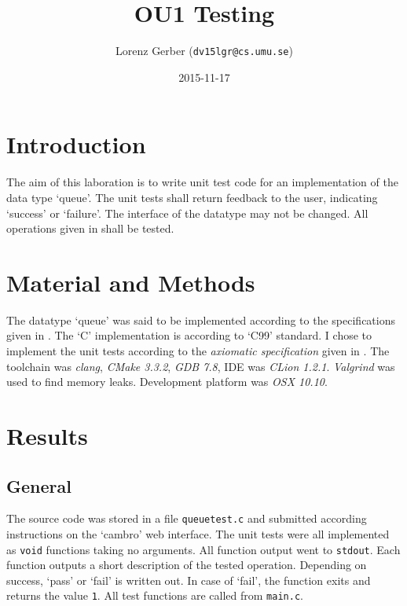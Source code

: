 \documentclass[a4paper,11pt,twoside]{article}
\title{OU1 Testing}
\author{Lorenz Gerber  ({\tt{dv15lgr@cs.umu.se}})}
\date{2015-11-17}
\begin{document}
\maketitle

\tableofcontents
\newpage

\section{Introduction} 
The aim of this laboration is to write unit test code for an
implementation of the data type `queue'. The unit tests shall 
return feedback to the user, indicating `success' or `failure'. The
interface of the datatype may not be changed. All operations given in
\cite[p. 155]{janlert2000} shall be tested.

\section{Material and Methods} 
The datatype `queue' was said to be implemented according to the 
specifications given in \cite[pp.155 -- 172]{janlert2000}. The
`C' implementation is according to `C99' standard. I chose to 
implement the unit tests according to the \textit{axiomatic specification} 
given in \cite[pp.156 + 157]{janlert2000}. The toolchain was \textit{clang}, 
\textit{CMake 3.3.2}, \textit{GDB 7.8}, IDE was \textit{CLion
  1.2.1}. \textit{Valgrind} was used to find memory leaks. Development platform was \textit{OSX 10.10}. 

\section{Results}
\subsection{General}
The source code was stored in a file \texttt{queuetest.c} and submitted
according instructions on the `cambro' web interface. The unit tests were
all implemented as \texttt{void} functions taking no arguments. All function
output went to \texttt{stdout}. Each function outputs a short description of 
the tested operation. Depending on success, `pass' or `fail' is written
out. In case of `fail', the function exits and returns the value
\texttt{1}. All test functions are called from \texttt{main.c}. 
\end{document}
